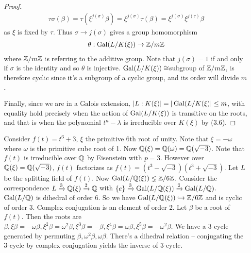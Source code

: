 \documentclass[a4paper]{article}
\begin{document}
\begin{thm}
\begin{rem}
\begin{proof}
\begin{equation*}
\begin{aligned}
\tau\sigma(\beta) = \tau(\xi^{j(\sigma)}\beta) = \xi^{j(\sigma)} \tau(\beta) = \xi^{j(\sigma)} \xi^{j(\tau)} \beta
\end{aligned}
\end{equation*}
as $\xi$ is fixed by $\tau$. Thus $\sigma \to j(\sigma)$ gives a group homomorphism
\begin{equation*}
\begin{aligned}
\theta: \operatorname{Gal}(L/K(\xi)) \to \mathbb{Z}/m\mathbb{Z}
\end{aligned}
\end{equation*}
where $\mathbb{Z}/m\mathbb{Z}$ is referring to the additive group. Note that $j(\sigma) = 1$ if and only if $\sigma$ is the identity and so $\theta$ is injective.  $\operatorname{Gal}(L/K(\xi)) \cong $subgroup of $\mathbb{Z}/m\mathbb{Z}$, is therefore cyclic since it's a subgroup of a cyclic group, and its order will divide $m$.

Finally, since we are in a Galois extension, $|L:K(\xi)| = |\operatorname{Gal}(L/K(\xi)| \leq m$, with equality hold precisely when the action of $\operatorname{Gal}(L/K(\xi))$ is transitive on the roots, and that is when the polynomial $t^n-\lambda$ is irreducible over $K(\xi)$ by (3.6).
\end{proof}
\end{rem}
\end{thm}

\begin{eg}
Consider $f(t) = t^6+3$, $\xi$ the primitive $6$th root of unity. Note that $\xi = -\omega$ where $\omega$ is the primitive cube root of 1. Now $\mathbb{Q}(\xi) = \mathbb{Q}(\omega) = \mathbb{Q}(\sqrt{-3})$. Note that $f(t)$ is irreducible over $\mathbb{Q}$ by Eisenstein with $p=3$. However over $\mathbb{Q}(\xi) = \mathbb{Q}(\sqrt{-3})$, $f(t)$ factorizes as $f(t) = (t^3 - \sqrt{-3})(t^3 + \sqrt{-3})$. Let $L$ be the splitting field of $f(t)$. Now $\operatorname{Gal}(L/\mathbb{Q}(\xi)) \lneq \mathbb{Z}/6\mathbb{Z}$. Consider the correspondence $L \xrightarrow{3} \mathbb{Q}(\xi) \xrightarrow{2} \mathbb{Q}$ with $\{e\} \xrightarrow{3} \operatorname{Gal}(L/\mathbb{Q}(\xi)) \xrightarrow{2} \operatorname{Gal}(L/\mathbb{Q})$. $\operatorname{Gal}(L/\mathbb{Q})$ is dihedral of order $6$. So we have $\operatorname{Gal}(L/\mathbb{Q}(\xi)) \hookrightarrow \mathbb{Z}/6\mathbb{Z}$ and is cyclic of order 3. Complex conjugation is an element of order 2. Let $\beta$ be a root of $f(t)$. Then the roots are $\beta, \xi \beta =-\omega \beta, \xi^2 \beta = \omega^2 \beta, \xi^3 \beta = -\beta, \xi^4 \beta = \omega \beta,\xi^5\beta = -\omega^2 \beta$. We have a 3-cycle generated by permuting $\beta, \omega^2\beta,\omega \beta$. There's a dihedral relation -- conjugating the 3-cycle by complex conjugation yields the inverse of 3-cycle.
\end{eg}
\end{document}
